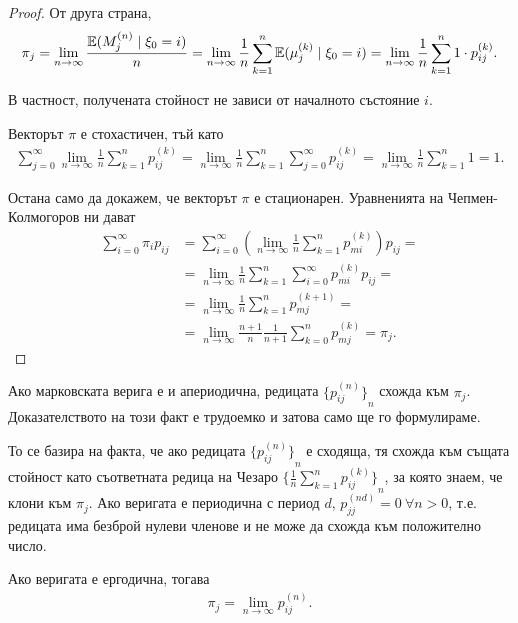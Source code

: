 \documentclass[numbers=endperiod, bibliography=totocnumbered]{scrartcl}
\begin{document}
\begin{proof}
  От друга страна,
  \begin{align*}
    \pi_j
    =
    \lim_{n \to \infty} \frac {\mathbb{E}(M^{(n)}_j \mid \xi_0 = i)} n
    =
    \lim_{n \to \infty} \frac 1 n \sum_{k=1}^n \mathbb{E}(\mu^{(k)}_j \mid \xi_0 = i)
    =
    \lim_{n \to \infty} \frac 1 n \sum_{k=1}^n 1 \cdot p_{ij}^{(k)}.
  \end{align*}

  В частност, получената стойност не зависи от началното състояние \( i \).

  Векторът \( \pi \) е стохастичен, тъй като
  \begin{align*}
    \sum_{j=0}^\infty \lim_{n \to \infty} \frac 1 n \sum_{k=1}^n p_{ij}^{(k)}
    =
    \lim_{n \to \infty} \frac 1 n \sum_{k=1}^n \sum_{j=0}^\infty p_{ij}^{(k)}
    =
    \lim_{n \to \infty} \frac 1 n \sum_{k=1}^n 1
    =
    1.
  \end{align*}

  Остана само да докажем, че векторът \( \pi \) е стационарен. Уравненията на Чепмен-Колмогоров ни дават
  \begin{align*}
    \sum_{i=0}^\infty \pi_i p_{ij}
    &=
    \sum_{i=0}^\infty \left( \lim_{n \to \infty} \frac 1 n \sum_{k=1}^n p_{mi}^{(k)} \right) p_{ij}
    = \\ &=
    \lim_{n \to \infty} \frac 1 n \sum_{k=1}^n \sum_{i=0}^\infty p_{mi}^{(k)} p_{ij}
    = \\ &=
    \lim_{n \to \infty} \frac 1 n \sum_{k=1}^n p_{mj}^{(k+1)}
    = \\ &=
    \lim_{n \to \infty} \frac {n+1} n \frac 1 {n+1} \sum_{k=0}^n p_{mj}^{(k)}
    =
    \pi_j.
  \end{align*}
\end{proof}

Ако марковската верига е и апериодична, редицата \( {\{ p_{ij}^{(n)} \}}_n \) схожда към \( \pi_j \). Доказателството на този факт е трудоемко и затова само ще го формулираме.

То се базира на факта, че ако редицата \( {\{ p_{ij}^{(n)} \}}_n \) е сходяща, тя схожда към същата стойност като съответната редица на Чезаро \( {\{ \frac 1 n \sum_{k=1}^n p_{ij}^{(k)} \}}_n \), за която знаем, че клони към \( \pi_j \). Ако веригата е периодична с период \( d \), \( p_{jj}^{(nd)} = 0~\forall n > 0 \), т.е. редицата има безброй нулеви членове и не може да схожда към положително число.

\begin{corollary}
  Ако веригата е ергодична, тогава
  \begin{align*}
    \pi_j = \lim_{n \to \infty} p_{ij}^{(n)}.
  \end{align*}
\end{corollary}
\end{document}
